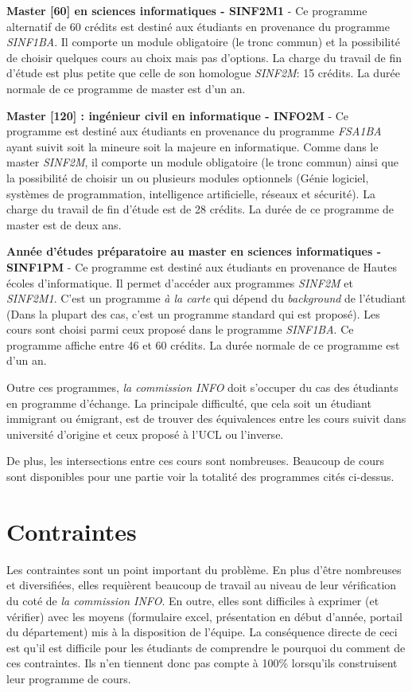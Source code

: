 \textbf{Master [60] en sciences informatiques - SINF2M1} \cite{SINF2M1} - Ce programme alternatif de 60 crédits est destiné aux étudiants en provenance du programme \textit{SINF1BA}. Il comporte un module obligatoire (le tronc commun) et la possibilité de choisir quelques cours au choix mais pas d'options. La charge du travail de fin d'étude est plus petite que celle de son homologue  \textit{SINF2M}: 15 crédits. La durée normale de ce programme de master est d'un an. 

\textbf{Master [120] : ingénieur civil en informatique - INFO2M} \cite{INFO2M} - Ce programme est destiné aux étudiants en provenance du programme \textit{FSA1BA} ayant suivit soit la mineure soit la majeure en informatique. Comme dans le master \textit{SINF2M}, il comporte un module obligatoire (le tronc commun) ainsi que la possibilité de choisir un ou plusieurs modules optionnels (Génie logiciel, systèmes de programmation, intelligence artificielle, réseaux et sécurité). La charge du travail de fin d'étude est de 28 crédits. La durée de ce programme de master est de deux ans.  

\textbf{Année d'études préparatoire au master en sciences informatiques - SINF1PM} \cite{SINF1PM} - Ce programme est destiné aux étudiants en provenance de Hautes écoles d'informatique. Il permet d'accéder aux programmes \textit{SINF2M} et \textit{SINF2M1}. C'est un programme \textit{à la carte} qui dépend du \textit{background} de l'étudiant (Dans la plupart des cas, c'est un programme standard qui est proposé). Les cours sont choisi parmi ceux proposé dans le programme \textit{SINF1BA}. Ce programme affiche entre 46 et 60 crédits. La durée normale de ce programme est d'un an.  
 

Outre ces programmes, \textit{la commission INFO} doit s'occuper du cas des étudiants en programme d'échange. La principale difficulté, que cela soit un étudiant immigrant ou émigrant, est de trouver des équivalences entre les cours suivit dans université d'origine et ceux proposé à l'UCL ou l'inverse. 

De plus, les intersections entre ces cours sont nombreuses. Beaucoup de cours sont disponibles pour une partie voir la totalité des programmes cités ci-dessus.  
\clearpage
\section{Contraintes}
\label{contraintes_intro}

Les contraintes sont un point important du problème. En plus d'être nombreuses et diversifiées, elles requièrent beaucoup de travail au niveau de leur vérification du coté de \textit{la commission INFO}. En outre, elles sont difficiles à exprimer (et vérifier) avec les moyens (formulaire excel, présentation en début d'année, portail du département) mis à la disposition de l'équipe. La conséquence directe de ceci est qu'il est difficile pour les étudiants de comprendre le pourquoi du comment de ces contraintes. Ils n'en tiennent donc pas compte à 100\% lorsqu'ils construisent leur programme de cours.

